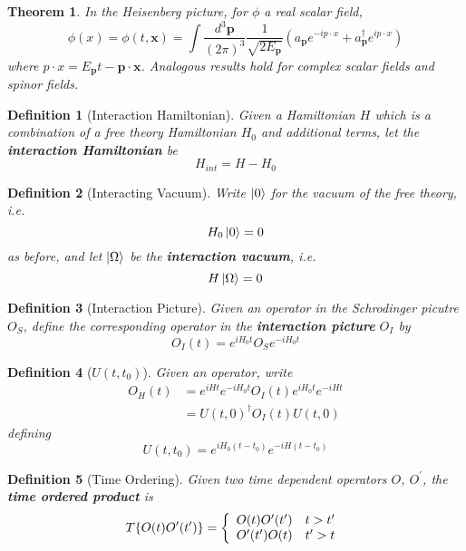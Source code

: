 \documentclass{article}
\newtheorem{theorem}{Theorem}[subsection]
\newtheorem{definition}{Definition}[subsection]
\newcommand{\tmeas}{\frac{d^3\bm{p}}{(2\pi)^3}}
\newcommand{\bam}[1]{\textbf{#1}}
\begin{document}
\begin{theorem}
In the Heisenberg picture, for $\phi$ a real scalar field, 
\[
\phi(x)=\phi(t,\bm{x}) = \int\tmeas  \frac{1}{\sqrt{2E_{\bm{p}}}} \left( a_{\bm{p}} e^{-i p\cdot x} + a_{\bm{p}}^\dagger e^{i p\cdot x} \right)
\]
where $p\cdot x = E_{\bm{p}}t-\bm{p}\cdot\bm{x}$. Analogous results hold for complex scalar fields and spinor fields. 
\end{theorem} 

\begin{definition}[Interaction Hamiltonian]
Given a Hamiltonian $H$ which is a combination of a free theory Hamiltonian $H_0$ and additional terms, let the \bam{interaction Hamiltonian} be 
\[
H_{int} = H - H_0
\]
\end{definition}

\begin{definition}[Interacting Vacuum]
Write $\ket{0}$ for the vacuum of the free theory, i.e. 
\[
H_0 \ket{0} = 0
\]
as before, and let $\ket{\Omega}$ be the \bam{interaction vacuum}, i.e. \[
H \ket{\Omega} = 0
\]
\end{definition}

\begin{definition}[Interaction Picture]
Given an operator in the Schrodinger picutre $O_S$, define the corresponding operator in the \bam{interaction picture} $O_I$ by 
\[
O_I(t) = e^{iH_0t} O_S e^{-iH_0t}
\]
\end{definition}

\begin{definition}[$U(t,t_0)$]
Given an operator, write 
\begin{align*}
O_H(t) &= e^{iHt} e^{-iH_0t} O_I(t) e^{iH_0t}e^{-iHt} \\
 &= U(t,0)^\dagger O_I(t) U(t,0)
\end{align*}
defining 
\[
U(t,t_0) = e^{iH_0 (t-t_0)}e^{-iH (t-t_0)}
\]
\end{definition}

\begin{definition}[Time Ordering]
Given two time dependent operators $O$, $O^\prime$, the \bam{time ordered product} is 
\[
T \{ O(t) O^\prime(t^\prime) \} = \left\{ \begin{array}{lc} O(t) O^\prime(t^\prime) & t > t^\prime \\
    O^\prime(t^\prime) O(t) & t^\prime > t 
    \end{array} \right. \\
\]
\end{definition}
\end{document}
